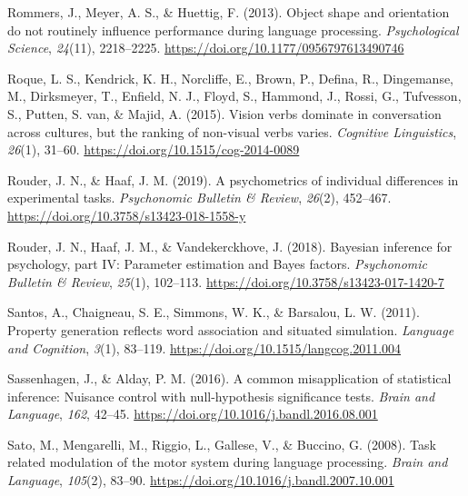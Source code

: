 \documentclass[
  12pt,
  man,floatsintext]{apa7}
\newlength{\cslhangindent}
\newlength{\cslentryspacingunit} %
\newenvironment{CSLReferences}[2] %
 {%
  \setlength{\parindent}{0pt}
  \ifodd #1
  \let\oldpar\par
  \def\par{\hangindent=\cslhangindent\oldpar}
  \fi
  \setlength{\parskip}{#2\cslentryspacingunit}
 }%
 {}
\begin{document}
\begin{CSLReferences}{1}{0}
\leavevmode{}%
Rommers, J., Meyer, A. S., \& Huettig, F. (2013). Object shape and orientation do not routinely influence performance during language processing. \emph{Psychological Science}, \emph{24}(11), 2218--2225. \url{https://doi.org/10.1177/0956797613490746}

\leavevmode{}%
Roque, L. S., Kendrick, K. H., Norcliffe, E., Brown, P., Defina, R., Dingemanse, M., Dirksmeyer, T., Enfield, N. J., Floyd, S., Hammond, J., Rossi, G., Tufvesson, S., Putten, S. van, \& Majid, A. (2015). Vision verbs dominate in conversation across cultures, but the ranking of non-visual verbs varies. \emph{Cognitive Linguistics}, \emph{26}(1), 31--60. \url{https://doi.org/10.1515/cog-2014-0089}

\leavevmode{}%
Rouder, J. N., \& Haaf, J. M. (2019). A psychometrics of individual differences in experimental tasks. \emph{Psychonomic Bulletin \& Review}, \emph{26}(2), 452--467. \url{https://doi.org/10.3758/s13423-018-1558-y}

\leavevmode{}%
Rouder, J. N., Haaf, J. M., \& Vandekerckhove, J. (2018). Bayesian inference for psychology, part {IV}: {Parameter} estimation and {Bayes} factors. \emph{Psychonomic Bulletin \& Review}, \emph{25}(1), 102--113. \url{https://doi.org/10.3758/s13423-017-1420-7}

\leavevmode{}%
Santos, A., Chaigneau, S. E., Simmons, W. K., \& Barsalou, L. W. (2011). Property generation reflects word association and situated simulation. \emph{Language and Cognition}, \emph{3}(1), 83--119. \url{https://doi.org/10.1515/langcog.2011.004}

\leavevmode{}%
Sassenhagen, J., \& Alday, P. M. (2016). A common misapplication of statistical inference: {Nuisance} control with null-hypothesis significance tests. \emph{Brain and Language}, \emph{162}, 42--45. \url{https://doi.org/10.1016/j.bandl.2016.08.001}

\leavevmode{}%
Sato, M., Mengarelli, M., Riggio, L., Gallese, V., \& Buccino, G. (2008). Task related modulation of the motor system during language processing. \emph{Brain and Language}, \emph{105}(2), 83--90. \url{https://doi.org/10.1016/j.bandl.2007.10.001}


\end{CSLReferences}
\end{document}
